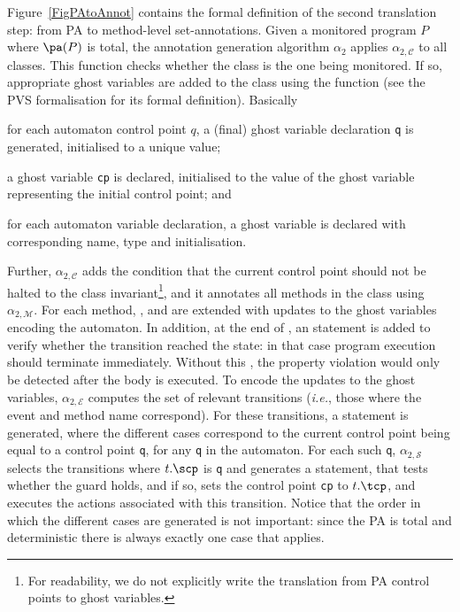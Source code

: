 Figure~\ref{FigPAtoAnnot} contains the formal definition of the
second translation step: from PA to method-level set-annotations.
Given a monitored program \(P\) where \(\pa(P)\) is total,
the annotation generation algorithm \(\alpha_2\) applies
\(\alpha_{2, \mathcal{C}}\) to all classes.
This function checks whether the class is the one being
monitored. If so, appropriate ghost variables are added to the class
using the function \newgvs (see the PVS formalisation for its formal
definition). Basically
\begin{inparaenum}
\item for each automaton control point \(q\), a (final) ghost
variable declaration \texttt{q} is generated, initialised to a unique value;
\item a ghost variable \texttt{cp} is declared, initialised to the
value of the ghost variable representing the initial control point; and
\item for each automaton variable declaration, a ghost variable is
declared with corresponding name, type and initialisation.
\end{inparaenum}
Further, \(\alpha_{2, \mathcal{C}}\) adds the condition that the
current control point should not be halted to the class
invariant\footnote{For readability, we do not explicitly write the
translation from PA control points to ghost variables.}, and it
annotates all methods in the class using \(\alpha_{2,
\mathcal{M}}\). For each method, \preset, \postset
and \excset are extended with updates to the ghost variables encoding
the automaton. In addition, at the end of \preset, an \Assert
statement is added to verify whether the transition reached the
\halted state: in that case program execution should terminate
immediately.  Without this \Assert, the property violation would only
be detected after the body is executed. To encode the updates to the
ghost variables, \(\alpha_{2, \mathcal{E}}\) computes the set of
relevant transitions (\emph{i.e.}, those where the event and method
name correspond). For these transitions, a \CaseJML statement is
generated, where the different cases correspond to the current control
point being equal to a control point \texttt{q}, for any
\texttt{q} in the automaton. For each such \texttt{q}, \(\alpha_{2,
\mathcal{S}}\) selects the transitions where \(t.\scp\) is \texttt{q}
and generates a \CaseJML statement, that tests whether the guard
holds, and if so, sets the control point \texttt{cp} to
\(t.\tcp\), and executes the actions associated with this
transition.  Notice that the order in which the different cases are
generated is not important: since the PA is total and deterministic
there is always exactly one case that applies.

